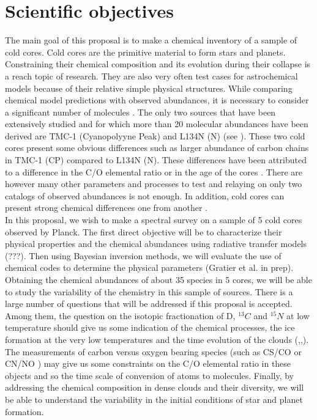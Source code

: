 \section{Scientific objectives}

The main goal of this proposal is to make a chemical inventory of a sample of cold cores. Cold cores are the primitive material to form stars and planets. Constraining their chemical composition and its evolution during their collapse is a reach topic of research. They are also very often test cases for astrochemical models because of their relative simple physical structures. While comparing chemical model predictions with observed abundances, it is necessary to consider a significant number of molecules \cite{Wakelam_2006,2013ChRv..113.8710A}. The only two sources that have been extensively studied and for which more than 20 molecular abundances have been derived are TMC-1 (Cyanopolyyne Peak) and L134N (N) (see \cite{2013ChRv..113.8710A}). These two cold cores present some obvious differences such as larger abundance of carbon chains in TMC-1 (CP) compared to L134N (N). These differences have been attributed to a difference in the C/O elemental ratio \cite{1998ApJ...501..207T} or in the age of the cores \cite{2013ChRv..113.8710A}. There are however many other parameters and processes to test and relaying on only two catalogs of observed abundances is not enough. In addition, cold cores can present strong chemical differences one from another \cite{2006FaDi..133...63B}.\\
In this proposal, we wish to make a spectral survey on a sample of 5 cold cores observed by Planck. The first direct objective will be to characterize their physical properties and the chemical abundances using radiative transfer models (???). Then using Bayesian inversion methods, we will evaluate the use of chemical codes to determine the physical parameters (Gratier et al. in prep). Obtaining the chemical abundances of about 35 species in 5 cores, we will be able to study the variability of the chemistry in this sample of sources. There is a large number of questions that will be addressed if this proposal is accepted. Among them, the question on the isotopic fractionation of D, $^{13}C$ and $^{15}N$ at low temperature should give us some indication of the chemical processes, the ice formation at the very low temperatures and the time evolution of the clouds (\cite{2013A&A...551A..38P},\cite{2014prpl.conf..859C},\cite{2015A&A...576A..99R}). The measurements of carbon versus oxygen bearing species (such as CS/CO \cite{1997ApJ...482..285B} or CN/NO \cite{2014A&A...562A..83L}) may give us some constraints on the C/O elemental ratio in these objects and so the time scale of conversion of atoms to molecules. Finally, by addressing the chemical composition in dense clouds and their diversity, we will be able to understand the variability in the initial conditions of star and planet formation. 

  